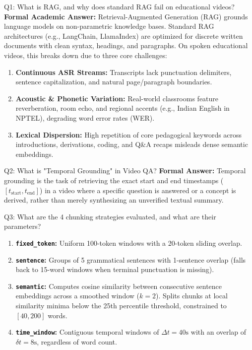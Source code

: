 \documentclass[10pt,a4paper]{article}
\begin{document}
\begin{quesbox}{Q1: What is RAG, and why does standard RAG fail on educational videos?}
\textbf{Formal Academic Answer:}
Retrieval-Augmented Generation (RAG) grounds language models on non-parametric knowledge bases. Standard RAG architectures (e.g., LangChain, LlamaIndex) are optimized for discrete written documents with clean syntax, headings, and paragraphs. On spoken educational videos, this breaks down due to three core challenges:
\begin{enumerate}[leftmargin=*]
    \item \textbf{Continuous ASR Streams:} Transcripts lack punctuation delimiters, sentence capitalization, and natural page/paragraph boundaries.
    \item \textbf{Acoustic \& Phonetic Variation:} Real-world classrooms feature reverberation, room echo, and regional accents (e.g., Indian English in NPTEL), degrading word error rates (WER).
    \item \textbf{Lexical Dispersion:} High repetition of core pedagogical keywords across introductions, derivations, coding, and Q\&A recaps misleads dense semantic embeddings.
\end{enumerate}
\end{quesbox}

\begin{quesbox}{Q2: What is "Temporal Grounding" in Video QA?}
\textbf{Formal Answer:}
Temporal grounding is the task of retrieving the exact start and end timestamps ($[t_{\text{start}}, t_{\text{end}}]$) in a video where a specific question is answered or a concept is derived, rather than merely synthesizing an unverified textual summary.
\end{quesbox}

\begin{quesbox}{Q3: What are the 4 chunking strategies evaluated, and what are their parameters?}
\begin{enumerate}[leftmargin=*]
    \item \textbf{\texttt{fixed\_token}:} Uniform 100-token windows with a 20-token sliding overlap.
    \item \textbf{\texttt{sentence}:} Groups of 5 grammatical sentences with 1-sentence overlap (falls back to 15-word windows when terminal punctuation is missing).
    \item \textbf{\texttt{semantic}:} Computes cosine similarity between consecutive sentence embeddings across a smoothed window ($k=2$). Splits chunks at local similarity minima below the 25th percentile threshold, constrained to $[40, 200]$ words.
    \item \textbf{\texttt{time\_window}:} Contiguous temporal windows of $\Delta t = 40\text{s}$ with an overlap of $\delta t = 8\text{s}$, regardless of word count.
\end{enumerate}
\end{quesbox}
\end{document}
